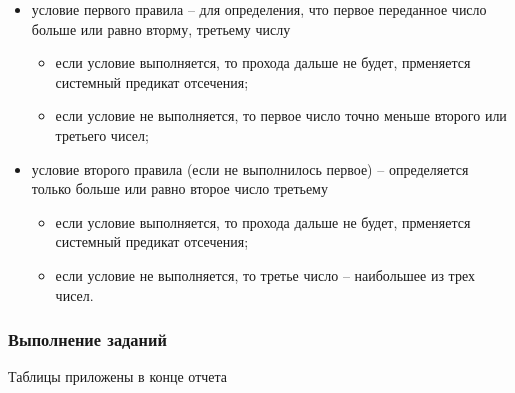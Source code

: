\begin{itemize}
	\item условие первого правила -- для определения, что первое переданное число больше или равно вторму, третьему числу
	\begin{itemize}
		\item если условие выполняется, то прохода дальше не будет, прменяется системный предикат отсечения;
		\item если условие не выполняется, то первое число точно меньше второго или третьего чисел;
	\end{itemize}
	\item условие второго правила (если не выполнилось первое) -- определяется только больше или равно второе число третьему
	\begin{itemize}
		\item если условие выполняется, то прохода дальше не будет, прменяется системный предикат отсечения;
		\item если условие не выполняется, то третье число -- наибольшее из трех чисел.
	\end{itemize}
\end{itemize}

\subsubsection{Выполнение заданий}

Таблицы приложены в конце отчета
